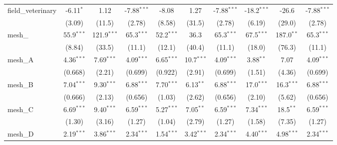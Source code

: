 \begin{tabular}{lccccccccc}
   field\_veterinary                                           & -6.11$^{*}$   & 1.12          & -7.88$^{***}$ & -8.08         & 1.27          & -7.88$^{***}$ & -18.2$^{***}$ & -26.6         & -7.88$^{***}$\\   
                                                               & (3.09)        & (11.5)        & (2.78)        & (8.58)        & (31.5)        & (2.78)        & (6.19)        & (29.0)        & (2.78)\\   
   mesh\_                                                      & 55.9$^{***}$  & 121.9$^{***}$ & 65.3$^{***}$  & 52.2$^{***}$  & 36.3          & 65.3$^{***}$  & 67.5$^{***}$  & 187.0$^{**}$  & 65.3$^{***}$\\   
                                                               & (8.84)        & (33.5)        & (11.1)        & (12.1)        & (40.4)        & (11.1)        & (18.0)        & (76.3)        & (11.1)\\   
   mesh\_A                                                     & 4.36$^{***}$  & 7.69$^{***}$  & 4.09$^{***}$  & 6.65$^{***}$  & 10.7$^{***}$  & 4.09$^{***}$  & 3.88$^{**}$   & 7.07          & 4.09$^{***}$\\   
                                                               & (0.668)       & (2.21)        & (0.699)       & (0.922)       & (2.91)        & (0.699)       & (1.51)        & (4.36)        & (0.699)\\   
   mesh\_B                                                     & 7.04$^{***}$  & 9.30$^{***}$  & 6.88$^{***}$  & 7.70$^{***}$  & 6.13$^{**}$   & 6.88$^{***}$  & 17.0$^{***}$  & 16.3$^{***}$  & 6.88$^{***}$\\   
                                                               & (0.666)       & (2.13)        & (0.656)       & (1.03)        & (2.62)        & (0.656)       & (2.10)        & (5.62)        & (0.656)\\   
   mesh\_C                                                     & 6.69$^{***}$  & 9.40$^{***}$  & 6.59$^{***}$  & 5.27$^{***}$  & 7.05$^{**}$   & 6.59$^{***}$  & 7.34$^{***}$  & 18.5$^{**}$   & 6.59$^{***}$\\   
                                                               & (1.30)        & (3.16)        & (1.27)        & (1.04)        & (2.79)        & (1.27)        & (1.58)        & (7.35)        & (1.27)\\   
   mesh\_D                                                     & 2.19$^{***}$  & 3.86$^{***}$  & 2.34$^{***}$  & 1.54$^{***}$  & 3.42$^{***}$  & 2.34$^{***}$  & 4.40$^{***}$  & 4.98$^{***}$  & 2.34$^{***}$\\   

\end{tabular}
